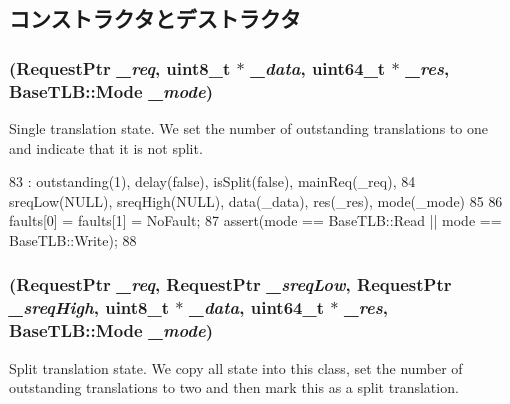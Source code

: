\subsection{コンストラクタとデストラクタ}
\hypertarget{classWholeTranslationState_aa9330770cac55c20fba11842fb48ceb9}{
\subsubsection[{WholeTranslationState}]{ ({\bf RequestPtr} {\em \_\-req}, \/  uint8\_\-t $\ast$ {\em \_\-data}, \/  uint64\_\-t $\ast$ {\em \_\-res}, \/  {\bf BaseTLB::Mode} {\em \_\-mode})}}
\label{classWholeTranslationState_aa9330770cac55c20fba11842fb48ceb9}
Single translation state. We set the number of outstanding translations to one and indicate that it is not split. 


\begin{DoxyCode}
83         : outstanding(1), delay(false), isSplit(false), mainReq(_req),
84           sreqLow(NULL), sreqHigh(NULL), data(_data), res(_res), mode(_mode)
85     {
86         faults[0] = faults[1] = NoFault;
87         assert(mode == BaseTLB::Read || mode == BaseTLB::Write);
88     }
\end{DoxyCode}
\hypertarget{classWholeTranslationState_a6e6163dd6e49b443f56c30800ac95b75}{
\subsubsection[{WholeTranslationState}]{ ({\bf RequestPtr} {\em \_\-req}, \/  {\bf RequestPtr} {\em \_\-sreqLow}, \/  {\bf RequestPtr} {\em \_\-sreqHigh}, \/  uint8\_\-t $\ast$ {\em \_\-data}, \/  uint64\_\-t $\ast$ {\em \_\-res}, \/  {\bf BaseTLB::Mode} {\em \_\-mode})}}
\label{classWholeTranslationState_a6e6163dd6e49b443f56c30800ac95b75}
Split translation state. We copy all state into this class, set the number of outstanding translations to two and then mark this as a split translation. 


